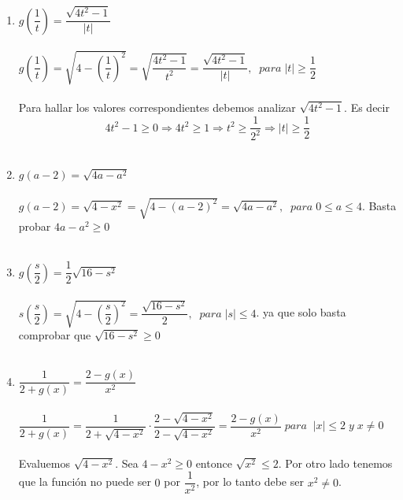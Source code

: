 \begin{enumerate}[ \bfseries 1.]
\begin{enumerate}[\bfseries (a)]
                \item $g\left( \dfrac{1}{t} \right) = \dfrac{\sqrt{4t^2-1}}{|t|}$\\\\
                $g\left( \dfrac{1}{t} \right) = \sqrt{4 - \left( \dfrac{1}{t} \right)^2} = \sqrt{\dfrac{4t^2 - 1}{t^2}} =\dfrac{\sqrt{4t^2 - 1}}{|t|}, \; \; para \; |t| \geq \dfrac{1}{2}$\\\\
                Para hallar los valores correspondientes debemos analizar $\sqrt{4t^2 - 1}$. Es decir $$4t^2-1 \geq 0 \Rightarrow 4t^2 \geq 1 \Rightarrow t^2 \geq \dfrac{1}{2^2} \Rightarrow |t| \geq \dfrac{1}{2}$$\\

                \item $g(a-2) = \sqrt{4a-a^2}$\\\\
                $g(a-2) = \sqrt{4 - x^2} = \sqrt{4 - (a-2)^2} = \sqrt{4a - a^2}, \; \; para \; 0\leq a \leq 4.$ Basta probar  $4a-a^2 \geq 0$\\\\

                \item $g \left( \dfrac{s}{2} \right) = \dfrac{1}{2} \sqrt{16 - s^2}$\\\\
                $s\left( \dfrac{s}{2} \right) = \sqrt{4 - \left( \dfrac{s}{2} \right)^2} = \dfrac{\sqrt{16 - s^2}}{2}, \; \; para \; |s| \leq 4$. ya que solo basta comprobar que $\sqrt{16 - s^2} \geq 0$\\\\

                \item $\dfrac{1}{2 +g(x)} = \dfrac{2-g(x)}{x^2}$\\\\ 
                $\dfrac{1}{2 +g(x)} = \dfrac{1}{2+ \sqrt{4-x^2}} \cdot \dfrac{2 - \sqrt{4-x^2}}{2 - \sqrt{4-x^2}} = \dfrac{2 - g(x)}{x^2}\; para \; \; |x| \leq 2 \; y \; x \neq 0$\\\\ 
                Evaluemos $\sqrt{4-x^2}$. Sea $4-x^2 \geq 0$ entonce $\sqrt{x^2} \leq 2$. Por otro lado tenemos que la función no puede ser $0$ por $\dfrac{1}{x^2}$, por lo tanto debe ser $x^2\neq 0$.\\\\ 
            \end{enumerate}


\end{enumerate}
